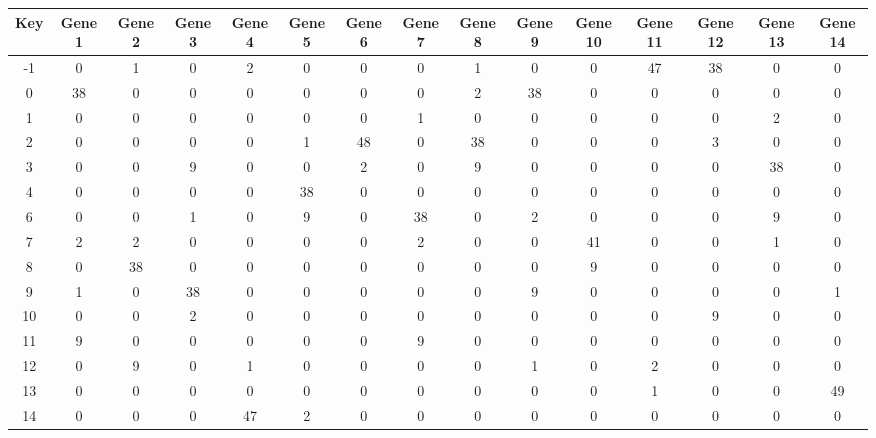 \begin{tabular}{|c|c|c|c|c|c|c|c|c|c|c|c|c|c|c|}
\hline
Key & Gene 1 & Gene 2 & Gene 3 & Gene 4 & Gene 5 & Gene 6 & Gene 7 & Gene 8 & Gene 9 & Gene 10 & Gene 11 & Gene 12 & Gene 13 & Gene 14 \\
\hline
-1 & 0 & 1 & 0 & 2 & 0 & 0 & 0 & 1 & 0 & 0 & 47 & 38 & 0 & 0 \\
0 & 38 & 0 & 0 & 0 & 0 & 0 & 0 & 2 & 38 & 0 & 0 & 0 & 0 & 0 \\
1 & 0 & 0 & 0 & 0 & 0 & 0 & 1 & 0 & 0 & 0 & 0 & 0 & 2 & 0 \\
2 & 0 & 0 & 0 & 0 & 1 & 48 & 0 & 38 & 0 & 0 & 0 & 3 & 0 & 0 \\
3 & 0 & 0 & 9 & 0 & 0 & 2 & 0 & 9 & 0 & 0 & 0 & 0 & 38 & 0 \\
4 & 0 & 0 & 0 & 0 & 38 & 0 & 0 & 0 & 0 & 0 & 0 & 0 & 0 & 0 \\
6 & 0 & 0 & 1 & 0 & 9 & 0 & 38 & 0 & 2 & 0 & 0 & 0 & 9 & 0 \\
7 & 2 & 2 & 0 & 0 & 0 & 0 & 2 & 0 & 0 & 41 & 0 & 0 & 1 & 0 \\
8 & 0 & 38 & 0 & 0 & 0 & 0 & 0 & 0 & 0 & 9 & 0 & 0 & 0 & 0 \\
9 & 1 & 0 & 38 & 0 & 0 & 0 & 0 & 0 & 9 & 0 & 0 & 0 & 0 & 1 \\
10 & 0 & 0 & 2 & 0 & 0 & 0 & 0 & 0 & 0 & 0 & 0 & 9 & 0 & 0 \\
11 & 9 & 0 & 0 & 0 & 0 & 0 & 9 & 0 & 0 & 0 & 0 & 0 & 0 & 0 \\
12 & 0 & 9 & 0 & 1 & 0 & 0 & 0 & 0 & 1 & 0 & 2 & 0 & 0 & 0 \\
13 & 0 & 0 & 0 & 0 & 0 & 0 & 0 & 0 & 0 & 0 & 1 & 0 & 0 & 49 \\
14 & 0 & 0 & 0 & 47 & 2 & 0 & 0 & 0 & 0 & 0 & 0 & 0 & 0 & 0 \\
\hline
\end{tabular}